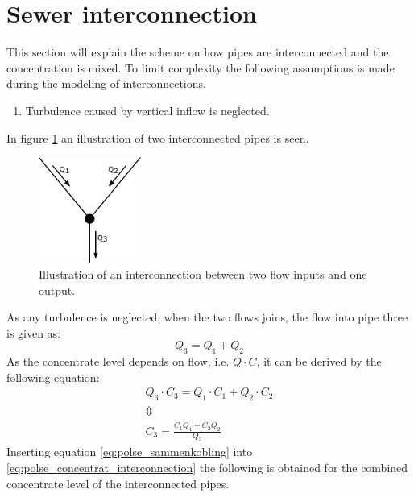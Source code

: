 \section{Sewer interconnection}\label{se:sewer_interconnection}
This section will explain the scheme on how pipes are interconnected and the concentration is mixed.
To limit complexity the following assumptions is made during the modeling of interconnections.
\begin{enumerate}
	\item Turbulence caused by vertical inflow is neglected.
\end{enumerate}

In figure \ref{fig:interconnections} an illustration of two interconnected pipes is seen.

\begin{figure}[H]
\centering
\includegraphics[width=0.30\textwidth]{report/modeling/pictures/interconnections}
\caption{Illustration of an interconnection between two flow inputs and one output.}
\label{fig:interconnections}
\end{figure} 

As any turbulence is neglected, when the two flows joins, the flow into pipe three is given as: 
\begin{equation} \label{eq:polse_sammenkobling} 
	\boxed{Q_3 = Q_1 + Q_2}
\end{equation} 
As the concentrate level depends on flow, i.e. $Q \cdot C$, it can be derived by the following equation: 
\begin{equation}\label{eq:polse_concentrat_interconnection}
\begin{array}{l}
	Q_3 \cdot C_3 = Q_1 \cdot C_1 + Q_2 \cdot C_2 \\
	\Updownarrow \\
	C_3 = \frac{C_1 Q_1 + C_2 Q_2}{Q_3}

\end{array}
\end{equation}
Inserting equation \ref{eq:polse_sammenkobling} into \ref{eq:polse_concentrat_interconnection} the following is obtained for the combined concentrate level of the interconnected pipes.
 
